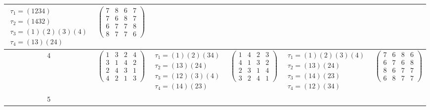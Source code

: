 \begin{longtable}{|c|p{2.7cm}|p{2.7cm}|p{2.7cm}|p{2.7cm}|p{2.7cm}|}
    $\begin{array}{l}\tau_{1}=(1234)\\ \tau_{2}=(1432)\\ \tau_{3}=(1)(2)(3)(4)\\ \tau_{4}=(13)(24)\end{array}$     &
    $\begin{pmatrix} 7 & 8 & 6 & 7 \\ 7 & 6 & 8 & 7 \\ 6 & 7 & 7 & 8 \\ 8 & 7 & 7 & 6 \end{pmatrix}$                                                                                           \\
    \hline
    4                                                                                                              &
    $\begin{pmatrix} 1 & 3 & 2 & 4 \\ 3 & 1 & 4 & 2 \\ 2 & 4 & 3 & 1 \\ 4 & 2 & 1 & 3 \end{pmatrix}$               &
    $\begin{array}{l}\tau_{1}=(1)(2)(34)\\ \tau_{2}=(13)(24)\\ \tau_{3}=(12)(3)(4)\\ \tau_{4}=(14)(23)\end{array}$ &
    $\begin{pmatrix} 1 & 4 & 2 & 3 \\ 4 & 1 & 3 & 2 \\ 2 & 3 & 1 & 4 \\ 3 & 2 & 4 & 1 \end{pmatrix}$               &
    $\begin{array}{l}\tau_{1}=(1)(2)(3)(4)\\ \tau_{2}=(13)(24)\\ \tau_{3}=(14)(23)\\ \tau_{4}=(12)(34)\end{array}$ &
    $\begin{pmatrix} 7 & 6 & 8 & 6 \\ 6 & 7 & 6 & 8 \\ 8 & 6 & 7 & 7 \\ 6 & 8 & 7 & 7 \end{pmatrix}$                                                                                           \\
    \hline
    5                                                                                                              &

\end{longtable}
